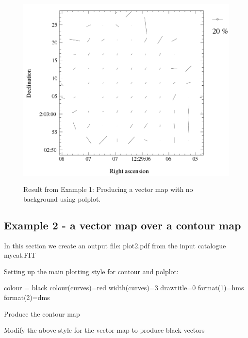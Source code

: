 \begin{figure}[t!]
\begin{center}
\includegraphics[width=0.75\linewidth]{sc22-kappa-plots-plot1.png}
\label{fig:kappa-plot1}
\caption [Vector map with polplot]{
  \small Result from Example 1: Producing a vector map with no background using polplot. 
}
\end{center}
\end{figure}

\subsection{ Example 2 - a vector map over a contour map}
\label{section:kappa-example2}


In this section we create an output file: plot2.pdf from the input catalogue mycat.FIT

\begin{terminalv}
\end{terminalv}

Setting up the main plotting style for contour and polplot:

\begin{terminalv}
colour = black
colour(curves)=red
width(curves)=3
drawtitle=0
format(1)=hms
format(2)=dms
\end{terminalv}


Produce the contour map

\begin{terminalv}
\end{terminalv}


Modify the above style for the vector map to produce black vectors

